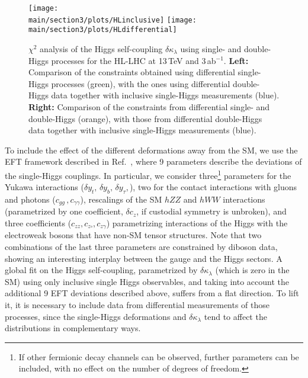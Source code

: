 \begin{figure}
	\centering
	\texttt{[image: \\main/section3/plots/HLinclusive]}\hfill
	\texttt{[image: \\main/section3/plots/HLdifferential]}
	\caption{$\chi^2$ analysis of the Higgs self-coupling $\delta \kappa_\lambda$ using single- and double-Higgs processes for the HL-LHC at 13\,TeV and 3\,ab$^{-1}$. \textbf{Left:} Comparison of the constraints obtained using differential single-Higgs processes (green), with the ones using differential double-Higgs data together with inclusive single-Higgs measurements (blue). \textbf{Right:} Comparison of the constraints from differential single- and double-Higgs (orange), with those from differential double-Higgs data together with inclusive single-Higgs measurements (blue).}
	\label{fig:hllhcchi2}
\end{figure}

To include the effect of the different deformations away from the SM, we use the EFT framework described in Ref.~\cite{DiVita:2017eyz}, where 9 parameters describe the deviations of the single-Higgs couplings. In particular, we consider three\footnote{If other fermionic decay channels can be observed, further parameters can be included, with no effect on the number of degrees of freedom.} parameters for the Yukawa interactions ($\delta y_t,\,\delta y_b,\,\delta y_\tau,$), two for the contact interactions with gluons and photons ($c_{gg}\,,c_{\gamma\gamma}$), rescalings of the SM $hZZ$ and $hWW$ interactions (parametrized by one coefficient, $\delta c_z$, if custodial symmetry is unbroken), and three coefficients ($c_{zz},c_{z\square},c_{z\gamma}$) parametrizing interactions of the Higgs with the electroweak bosons that have non-SM tensor structures. Note that two combinations of the last three parameters are constrained by diboson data, showing an interesting interplay between the gauge and the Higgs sectors. A global fit on the Higgs self-coupling, parametrized by $\delta\kappa_\lambda$ (which is zero in the SM) using only inclusive single Higgs observables, and taking into account the additional 9 EFT deviations described above, suffers from a flat direction. To lift it, it is necessary to include data from differential measurements of those processes, since the single-Higgs deformations and $\delta\kappa_\lambda$ tend to affect the distributions in complementary ways.
\medskip

